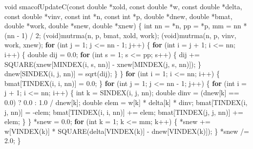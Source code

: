 \documentclass[12pt,]{article}
\newenvironment{Shaded}{\begin{snugshade}}{\end{snugshade}}
\newcommand{\DataTypeTok}[1]{\textcolor[rgb]{0.13,0.29,0.53}{#1}}
\newcommand{\DecValTok}[1]{\textcolor[rgb]{0.00,0.00,0.81}{#1}}
\newcommand{\FloatTok}[1]{\textcolor[rgb]{0.00,0.00,0.81}{#1}}
\newcommand{\ControlFlowTok}[1]{\textcolor[rgb]{0.13,0.29,0.53}{\textbf{#1}}}
\newcommand{\NormalTok}[1]{#1}
\begin{document}
\begin{Shaded}
\begin{Highlighting}[]
\DataTypeTok{void}\NormalTok{ smacofUpdateC(}\DataTypeTok{const} \DataTypeTok{double}\NormalTok{ *xold, }\DataTypeTok{const} \DataTypeTok{double}\NormalTok{ *w, }\DataTypeTok{const} \DataTypeTok{double}\NormalTok{ *delta,}
                   \DataTypeTok{const} \DataTypeTok{double}\NormalTok{ *vinv, }\DataTypeTok{const} \DataTypeTok{int}\NormalTok{ *n, }\DataTypeTok{const} \DataTypeTok{int}\NormalTok{ *p, }\DataTypeTok{double}\NormalTok{ *dnew,}
                   \DataTypeTok{double}\NormalTok{ *bmat, }\DataTypeTok{double}\NormalTok{ *work, }\DataTypeTok{double}\NormalTok{ *snew, }\DataTypeTok{double}\NormalTok{ *xnew) \{}
    \DataTypeTok{int}\NormalTok{ nn = *n, pp = *p, mm = nn * (nn - }\DecValTok{1}\NormalTok{) / }\DecValTok{2}\NormalTok{;}
\NormalTok{    (}\DataTypeTok{void}\NormalTok{)mutrma(n, p, bmat, xold, work);}
\NormalTok{    (}\DataTypeTok{void}\NormalTok{)mutrma(n, p, vinv, work, xnew);}
    \ControlFlowTok{for}\NormalTok{ (}\DataTypeTok{int}\NormalTok{ j = }\DecValTok{1}\NormalTok{; j <= nn - }\DecValTok{1}\NormalTok{; j++) \{}
        \ControlFlowTok{for}\NormalTok{ (}\DataTypeTok{int}\NormalTok{ i = j + }\DecValTok{1}\NormalTok{; i <= nn; i++) \{}
            \DataTypeTok{double}\NormalTok{ dij = }\FloatTok{0.0}\NormalTok{;}
            \ControlFlowTok{for}\NormalTok{ (}\DataTypeTok{int}\NormalTok{ s = }\DecValTok{1}\NormalTok{; s <= pp; s++) \{}
\NormalTok{                dij += SQUARE(xnew[MINDEX(i, s, nn)] - xnew[MINDEX(j, s, nn)]);}
\NormalTok{            \}}
\NormalTok{            dnew[SINDEX(i, j, nn)] = sqrt(dij);}
\NormalTok{        \}}
\NormalTok{    \}}
    \ControlFlowTok{for}\NormalTok{ (}\DataTypeTok{int}\NormalTok{ i = }\DecValTok{1}\NormalTok{; i <= nn; i++) \{}
\NormalTok{        bmat[TINDEX(i, i, nn)] = }\FloatTok{0.0}\NormalTok{;}
\NormalTok{    \}}
    \ControlFlowTok{for}\NormalTok{ (}\DataTypeTok{int}\NormalTok{ j = }\DecValTok{1}\NormalTok{; j <= nn - }\DecValTok{1}\NormalTok{; j++) \{}
        \ControlFlowTok{for}\NormalTok{ (}\DataTypeTok{int}\NormalTok{ i = j + }\DecValTok{1}\NormalTok{; i <= nn; i++) \{}
            \DataTypeTok{int}\NormalTok{ k = SINDEX(i, j, nn);}
            \DataTypeTok{double}\NormalTok{ dinv = (dnew[k] == }\FloatTok{0.0}\NormalTok{) ? }\FloatTok{0.0}\NormalTok{ : }\FloatTok{1.0}\NormalTok{ / dnew[k];}
            \DataTypeTok{double}\NormalTok{ elem = w[k] * delta[k] * dinv;}
\NormalTok{            bmat[TINDEX(i, j, nn)] = -elem;}
\NormalTok{            bmat[TINDEX(i, i, nn)] += elem;}
\NormalTok{            bmat[TINDEX(j, j, nn)] += elem;}
\NormalTok{        \}}
\NormalTok{    \}}
\NormalTok{    *snew = }\FloatTok{0.0}\NormalTok{;}
    \ControlFlowTok{for}\NormalTok{ (}\DataTypeTok{int}\NormalTok{ k = }\DecValTok{1}\NormalTok{; k <= mm; k++) \{}
\NormalTok{        *snew += w[VINDEX(k)] * SQUARE(delta[VINDEX(k)] - dnew[VINDEX(k)]);}
\NormalTok{    \}}
\NormalTok{    *snew /= }\FloatTok{2.0}\NormalTok{;}
\NormalTok{\}}
\end{Highlighting}
\end{Shaded}
\end{document}
